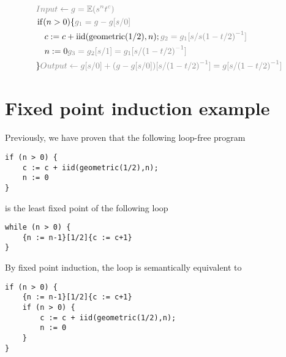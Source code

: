 \documentclass{article}
\DeclareMathOperator*{\iid}{iid}
\newcommand{\E}{\mathbb{E}}
\newcommand{\Geom}{\mathrm{geometric}}
\newcommand{\Anno}[1]{\color{gray}{#1}}
\begin{document}
\begin{align*}
	 & \Anno{Input \gets g = \E(s^n t^c)}                                                 \\
	 & \operatorname{if} (n>0) \{ \Anno{g_1 = g-g[s/0]}                                   \\
	 & \quad c := c + \iid(\Geom(1/2),n) ; \Anno{g_2 = g_1[s/s {(1-t/2)}^{-1}]}           \\
	 & \quad n := 0 \Anno{g_3 = g_2[s/1] = g_1[s/{(1-t/2)}^{-1}]}                         \\
	 & \} \Anno{Output \gets g[s/0] + (g-g[s/0])[s/{(1-t/2)}^{-1}] = g[s/{(1-t/2)}^{-1}]} \\
\end{align*}

\section{Fixed point induction example}

Previously, we have proven that the following loop-free program 
\begin{verbatim}
if (n > 0) {
    c := c + iid(geometric(1/2),n);
    n := 0
}
\end{verbatim}
is the least fixed point of the following loop
\begin{verbatim}
while (n > 0) {
    {n := n-1}[1/2]{c := c+1}
}
\end{verbatim}
By fixed point induction, the loop is semantically equivalent to
\begin{verbatim}
if (n > 0) {
    {n := n-1}[1/2]{c := c+1}
    if (n > 0) {
        c := c + iid(geometric(1/2),n);
        n := 0
    }
}
\end{verbatim}
\end{document}
